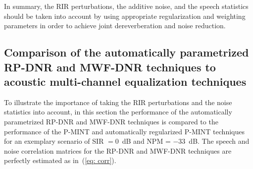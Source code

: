 \documentclass[draftcls,onecolumn,11pt]{IEEEtran}
\begin{document}
In summary, the RIR perturbations, the additive noise, and the speech statistics should be taken into account by using appropriate regularization and weighting parameters in order to achieve joint dereverberation and noise reduction.

\subsection{Comparison of the automatically parametrized RP-DNR and MWF-DNR techniques to acoustic multi-channel equalization techniques}
\label{sec: aem}
To illustrate the importance of taking the RIR perturbations and the noise statistics into account, in this section the performance of the automatically parametrized RP-DNR and MWF-DNR techniques is compared to the performance of the P-MINT and automatically regularized P-MINT techniques for an exemplary scenario of SIR $= 0$~dB and NPM = $-33$~dB. 
The speech and noise correlation matrices for the RP-DNR and MWF-DNR techniques are perfectly estimated as in~(\ref{eq: corr}).
\end{document}
